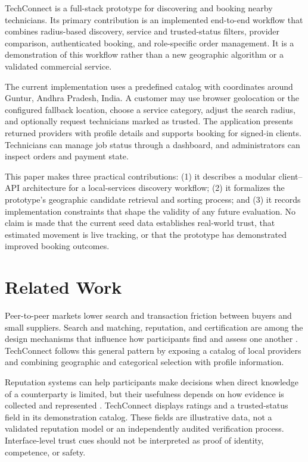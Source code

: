\documentclass[conference]{IEEEtran}
\begin{document}
TechConnect is a full-stack prototype for discovering and booking nearby technicians. Its primary contribution is an implemented end-to-end workflow that combines radius-based discovery, service and trusted-status filters, provider comparison, authenticated booking, and role-specific order management. It is a demonstration of this workflow rather than a new geographic algorithm or a validated commercial service.

The current implementation uses a predefined catalog with coordinates around Guntur, Andhra Pradesh, India. A customer may use browser geolocation or the configured fallback location, choose a service category, adjust the search radius, and optionally request technicians marked as trusted. The application presents returned providers with profile details and supports booking for signed-in clients. Technicians can manage job status through a dashboard, and administrators can inspect orders and payment state.

This paper makes three practical contributions: (1) it describes a modular client--API architecture for a local-services discovery workflow; (2) it formalizes the prototype's geographic candidate retrieval and sorting process; and (3) it records implementation constraints that shape the validity of any future evaluation. No claim is made that the current seed data establishes real-world trust, that estimated movement is live tracking, or that the prototype has demonstrated improved booking outcomes.

\section{Related Work}
Peer-to-peer markets lower search and transaction friction between buyers and small suppliers. Search and matching, reputation, and certification are among the design mechanisms that influence how participants find and assess one another \cite{einav2016}. TechConnect follows this general pattern by exposing a catalog of local providers and combining geographic and categorical selection with profile information.

Reputation systems can help participants make decisions when direct knowledge of a counterparty is limited, but their usefulness depends on how evidence is collected and represented \cite{resnick2000}. TechConnect displays ratings and a trusted-status field in its demonstration catalog. These fields are illustrative data, not a validated reputation model or an independently audited verification process. Interface-level trust cues should not be interpreted as proof of identity, competence, or safety.
\end{document}

